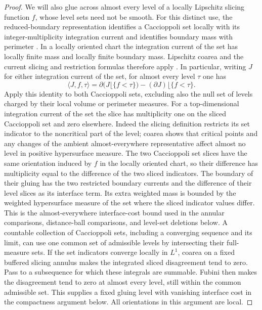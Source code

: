 \begin{proof}
We will also glue across almost every level of a locally Lipschitz
slicing function $f$, whose level sets need not be smooth.
For this distinct use, the reduced-boundary representation identifies
a Caccioppoli set locally with its integer-multiplicity integration current and
identifies boundary mass with perimeter
\citep[Chapter~3, Section~4, Equation~(4.1) and Theorem~4.3]{simonGMT}.
In a locally oriented chart the integration current of the set has locally finite mass
and locally finite boundary mass.  Lipschitz coarea and the current
slicing and restriction formulas therefore apply
\citep[Chapter~3, Section~2, Equations~(2.8)--(2.9);
Chapter~6, Section~4, Lemmas~4.1 and~4.5 and
Definition~4.4]{simonGMT}.
In particular, writing $J$ for either integration current of the set, for almost every
level $\tau$ one has
\[
 \langle J,f,\tau\rangle
   =\partial\bigl(J\lfloor\{f<\tau\}\bigr)
             -(\partial J)\lfloor\{f<\tau\}.
\]
Apply this identity to both Caccioppoli sets, excluding also the null set of
levels charged by their local volume or perimeter measures.
For a top-dimensional integration current of the set the slice has multiplicity one
on the sliced Caccioppoli set and zero elsewhere.  Indeed the slicing
definition restricts its set indicator to the noncritical part of
the level; coarea shows that critical points and any changes of the
ambient almost-everywhere representative affect almost no level in
positive hypersurface measure.  The two Caccioppoli set slices have the same
orientation induced by $f$ in the locally oriented chart, so their
difference has multiplicity equal to the difference of the two sliced
indicators.
The boundary of their gluing has the two restricted boundary currents
and the difference of their level slices as its interface term.
Its extra weighted mass is bounded by the weighted hypersurface
measure of the set where the sliced indicator values differ.
This is the almost-everywhere interface-cost bound used in the
annular comparisons, distance-ball comparisons, and level-set
deletions below.  A countable collection of Caccioppoli sets, including a
converging sequence and its limit, can use one common set of
admissible levels by intersecting their full-measure sets.
If the set indicators converge locally in $L^1$, coarea on a fixed
buffered slicing annulus makes the integrated sliced disagreement
tend to zero.  Pass to a subsequence for which these integrals are
summable.  Fubini then makes the disagreement tend to zero at almost
every level, still within the common admissible set.
This supplies a fixed gluing level with vanishing interface cost in
the compactness argument below.  All orientations in this argument
are local.


\end{proof}
